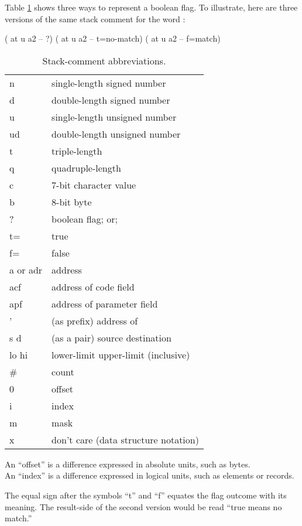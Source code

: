 Table \ref{tab-5-2} shows three ways to represent a boolean flag.  To
illustrate, here are three versions of the same stack comment for the
word :
\begin{Code}
( at u a2 -- ?)
( at u a2 -- t=no-match)
( at u a2 -- f=match)
\end{Code}
\begin{table}[hhhh]
\caption{Stack-comment abbreviations.}
\label{tab-5-2}
\vspace{1ex}
\blackline{1ex}
\begin{tabular}{@{\hspace{2.5em}}ll}
n             &  single-length signed number \\
d             &  double-length signed number \\
u             &  single-length unsigned number \\
ud            &  double-length unsigned number \\
t             &  triple-length \\
q             &  quadruple-length \\
c             &  7-bit character value \\
b             &  8-bit byte \\
?             &  boolean flag; or; \\
\quad t=         &  true \\
\quad f=         &  false \\
a or adr      &  address \\
acf           &  address of code field \\
apf           &  address of parameter field \\
'             &  (as prefix) address of \\
s d           &  (as a pair) source destination \\
lo hi         &  lower-limit upper-limit (inclusive) \\
\#            &   count \\
0             &  offset \\
i             &  index \\
m             &  mask \\
x             &  don't care (data structure notation) \\
\end{tabular}
\smallskip

An ``offset'' is a difference expressed in absolute units, such as bytes.\\
An ``index'' is a difference expressed in logical units, such as
elements or records.
\vspace{0ex}
\blackline{0ex}
\end{table}
The equal sign after the symbols ``t'' and ``f'' equates the flag
outcome with its meaning.  The result-side of the second version would
be read ``true means no match.''

